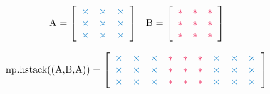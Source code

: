 \begin{align*}
\text{\li{A}} = \left[\begin{array}{ccc}
\textcolor{blue}{\times}&\textcolor{blue}{\times}&\textcolor{blue}{\times}\\
\textcolor{blue}{\times}&\textcolor{blue}{\times}&\textcolor{blue}{\times}\\
\textcolor{blue}{\times}&\textcolor{blue}{\times}&\textcolor{blue}{\times}
\end{array}\right]
&&
\text{\li{B}} = \left[\begin{array}{ccc}
\textcolor{red}{*} & \textcolor{red}{*} & \textcolor{red}{*} \\
\textcolor{red}{*} & \textcolor{red}{*} & \textcolor{red}{*} \\
\textcolor{red}{*} & \textcolor{red}{*} & \textcolor{red}{*}
\end{array}\right]
\end{align*}

\begin{align*}
\text{\li{np.hstack((A,B,A))}} =
\left[\begin{array}{ccccccccc}
\textcolor{blue}{\times}&\textcolor{blue}{\times}&\textcolor{blue}{\times}&
\textcolor{red}{*} & \textcolor{red}{*} & \textcolor{red}{*}&
\textcolor{blue}{\times}&\textcolor{blue}{\times}&\textcolor{blue}{\times}\\
\textcolor{blue}{\times}&\textcolor{blue}{\times}&\textcolor{blue}{\times}&
\textcolor{red}{*} & \textcolor{red}{*} & \textcolor{red}{*}&
\textcolor{blue}{\times}&\textcolor{blue}{\times}&\textcolor{blue}{\times}\\
\textcolor{blue}{\times}&\textcolor{blue}{\times}&\textcolor{blue}{\times}&
\textcolor{red}{*} & \textcolor{red}{*} & \textcolor{red}{*}&
\textcolor{blue}{\times}&\textcolor{blue}{\times}&\textcolor{blue}{\times}
\end{array}\right]
\end{align*}


